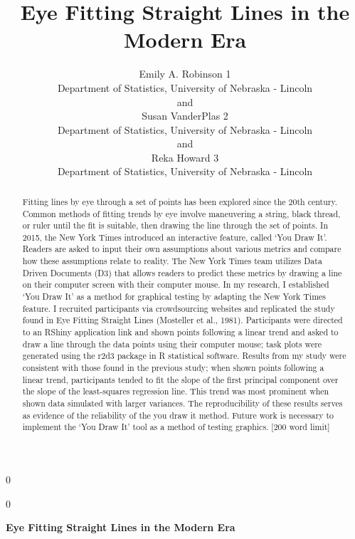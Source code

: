 \documentclass[12pt]{article}
\newcommand{\blind}{0}
\begin{document}
\def\spacingset#1{\renewcommand{\baselinestretch}%
{#1}\small\normalsize} \spacingset{1}



\blind
{
  \title{\bf Eye Fitting Straight Lines in the Modern Era}

  \author{
        Emily A. Robinson 1 \\
    Department of Statistics, University of Nebraska - Lincoln\\
     and \\     Susan VanderPlas 2 \\
    Department of Statistics, University of Nebraska - Lincoln\\
     and \\     Reka Howard 3 \\
    Department of Statistics, University of Nebraska - Lincoln\\
      }
  \maketitle
} \fi

\blind
{
  \bigskip
  \bigskip
  \bigskip
  \begin{center}
    {\LARGE\bf Eye Fitting Straight Lines in the Modern Era}
  \end{center}
  \medskip
} \fi

\bigskip
\begin{abstract}
Fitting lines by eye through a set of points has been explored since the
20th century. Common methods of fitting trends by eye involve
maneuvering a string, black thread, or ruler until the fit is suitable,
then drawing the line through the set of points. In 2015, the New York
Times introduced an interactive feature, called `You Draw It'. Readers
are asked to input their own assumptions about various metrics and
compare how these assumptions relate to reality. The New York Times team
utilizes Data Driven Documents (D3) that allows readers to predict these
metrics by drawing a line on their computer screen with their computer
mouse. In my research, I established `You Draw It' as a method for
graphical testing by adapting the New York Times feature. I recruited
participants via crowdsourcing websites and replicated the study found
in Eye Fitting Straight Lines (Mosteller et al., 1981). Participants
were directed to an RShiny application link and shown points following a
linear trend and asked to draw a line through the data points using
their computer mouse; task plots were generated using the r2d3 package
in R statistical software. Results from my study were consistent with
those found in the previous study; when shown points following a linear
trend, participants tended to fit the slope of the first principal
component over the slope of the least-squares regression line. This
trend was most prominent when shown data simulated with larger
variances. The reproducibility of these results serves as evidence of
the reliability of the you draw it method. Future work is necessary to
implement the `You Draw It' tool as a method of testing graphics. {[}200
word limit{]}
\end{abstract}
\end{document}
